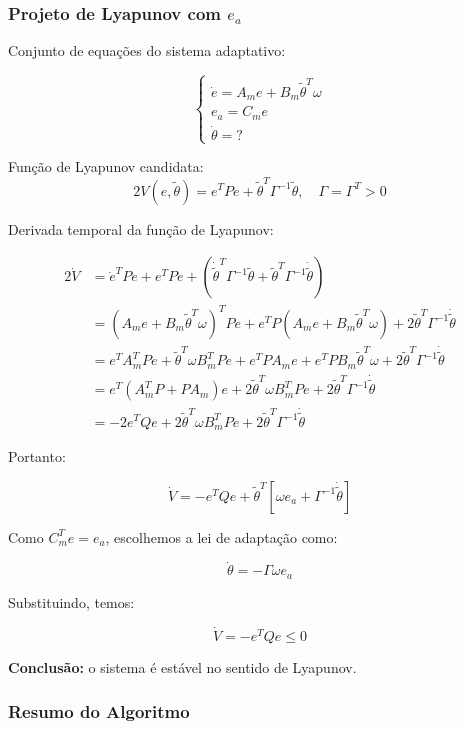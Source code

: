 \documentclass[10pt]{article}
\begin{document}
\subsubsection{Projeto de Lyapunov com $e_a$}

Conjunto de equações do sistema adaptativo:

\[
\begin{cases}
\dot{e} = A_m e + B_m \tilde{\theta}^T \omega \\
e_a = C_m e \\
\dot{\theta} = ?
\end{cases}
\]

Função de Lyapunov candidata:
\[
2V(e, \tilde{\theta}) = e^T P e + \tilde{\theta}^T \Gamma^{-1} \tilde{\theta}, \quad \Gamma = \Gamma^T > 0
\]


Derivada temporal da função de Lyapunov:

\[
\begin{aligned}
2\dot{V} &= \dot{e}^T P e + e^T P \dot{e} + \left(\dot{\tilde{\theta}}^T \Gamma^{-1} \tilde{\theta} + \tilde{\theta}^T \Gamma^{-1} \dot{\tilde{\theta}} \right) \\
&= (A_m e + B_m \tilde{\theta}^T \omega)^T P e + e^T P (A_m e + B_m \tilde{\theta}^T \omega) + 2 \tilde{\theta}^T \Gamma^{-1} \dot{\tilde{\theta}} \\
&= e^T A_m^T P e + \tilde{\theta}^T \omega B_m^T P e + e^T P A_m e + e^T P B_m \tilde{\theta}^T \omega + 2 \tilde{\theta}^T \Gamma^{-1} \dot{\tilde{\theta}} \\
&= e^T (A_m^T P + P A_m) e + 2 \tilde{\theta}^T \omega B_m^T P e + 2 \tilde{\theta}^T \Gamma^{-1} \dot{\tilde{\theta}} \\
&= -2 e^T Q e + 2 \tilde{\theta}^T \omega B_m^T P e + 2 \tilde{\theta}^T \Gamma^{-1} \dot{\tilde{\theta}}
\end{aligned}
\]

Portanto:

\[
\dot{V} = -e^T Q e + \tilde{\theta}^T \left[ \omega e_a + \Gamma^{-1} \dot{\tilde{\theta}}\right]
\]

Como $C_m^T e = e_a$, escolhemos a lei de adaptação como:

\[
\dot{\theta} = -\Gamma \omega e_a
\]

Substituindo, temos:

\[
\dot{V} = -e^T Q e \leq 0
\]

\textbf{Conclusão:} o sistema é estável no sentido de Lyapunov.

\subsubsection{Resumo do Algoritmo}
\end{document}
